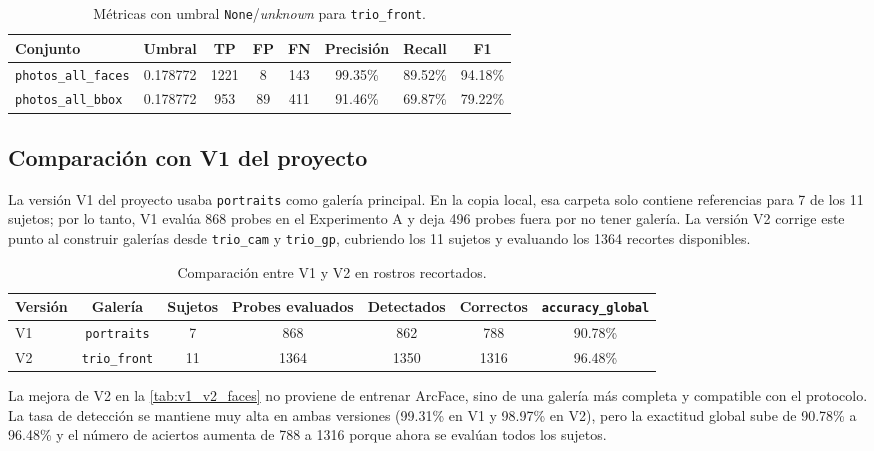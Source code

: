 \documentclass[11pt]{article}
\newcommand{\accglobal}{\texttt{accuracy\_global}}
\begin{document}
\begin{table}[H]
\centering
\caption{M\'etricas con umbral \texttt{None}/\textit{unknown} para \texttt{trio\_front}.}
\label{tab:threshold_unknown}
\begin{adjustbox}{max width=\textwidth}
\begin{tabular}{lccccccc}
\toprule
Conjunto & Umbral & TP & FP & FN & Precisi\'on & Recall & F1 \\
\midrule
\texttt{photos\_all\_faces} & 0.178772 & 1221 & 8 & 143 & 99.35\% & 89.52\% & 94.18\% \\
\texttt{photos\_all\_bbox} & 0.178772 & 953 & 89 & 411 & 91.46\% & 69.87\% & 79.22\% \\
\bottomrule
\end{tabular}
\end{adjustbox}
\end{table}

\subsection{Comparaci\'on con V1 del proyecto}

La versi\'on V1 del proyecto usaba \texttt{portraits} como galer\'ia principal. En la copia local, esa carpeta solo contiene referencias para 7 de los 11 sujetos; por lo tanto, V1 eval\'ua 868 probes en el Experimento A y deja 496 probes fuera por no tener galer\'ia. La versi\'on V2 corrige este punto al construir galer\'ias desde \texttt{trio\_cam} y \texttt{trio\_gp}, cubriendo los 11 sujetos y evaluando los 1364 recortes disponibles.

\begin{table}[H]
\centering
\caption{Comparaci\'on entre V1 y V2 en rostros recortados.}
\label{tab:v1_v2_faces}
\begin{adjustbox}{max width=\textwidth}
\begin{tabular}{lcccccc}
\toprule
Versi\'on & Galer\'ia & Sujetos & Probes evaluados & Detectados & Correctos & \accglobal{} \\
\midrule
V1 & \texttt{portraits} & 7 & 868 & 862 & 788 & 90.78\% \\
V2 & \texttt{trio\_front} & 11 & 1364 & 1350 & 1316 & 96.48\% \\
\bottomrule
\end{tabular}
\end{adjustbox}
\end{table}

La mejora de V2 en la \autoref{tab:v1_v2_faces} no proviene de entrenar ArcFace, sino de una galer\'ia m\'as completa y compatible con el protocolo. La tasa de detecci\'on se mantiene muy alta en ambas versiones (99.31\% en V1 y 98.97\% en V2), pero la exactitud global sube de 90.78\% a 96.48\% y el n\'umero de aciertos aumenta de 788 a 1316 porque ahora se eval\'uan todos los sujetos.
\end{document}

